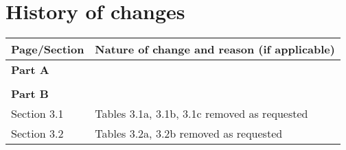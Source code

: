 \section*{History of changes}

\begin{tabular}{|l|l|}
\hline
\textbf{Page/Section} & \textbf{Nature of change and reason (if applicable)} \tabularnewline
\hline
\multicolumn{2}{|l|}{\textbf{Part A}} \\
\hline
 & \\
\hline
\multicolumn{2}{|l|}{\textbf{Part B}} \\
\hline
Section 3.1 & Tables 3.1a, 3.1b, 3.1c removed as requested \\
\hline
Section 3.2 & Tables 3.2a, 3.2b removed as requested \\
\hline
\end{tabular}